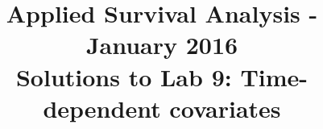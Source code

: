 \documentclass[11pt,a4paper]{article}
\begin{document}
\title{Applied Survival Analysis - January 2016\\Solutions to Lab 9: Time-dependent covariates}
\date{\vspace{-10ex}}
\author{\vspace{-10ex}}
\maketitle

\end{document}
